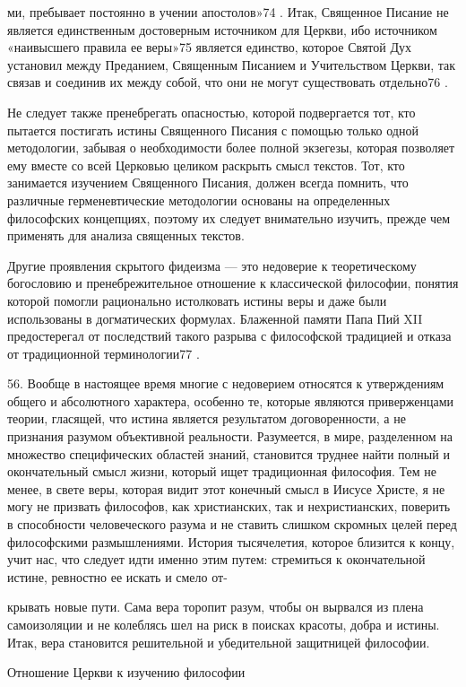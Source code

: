 \documentclass[a5paper,10pt]{article}
\begin{document}
ми, пребывает постоянно в учении апостолов»74 . Итак, Священное Писание не
является единственным достоверным источником для Церкви, ибо источником
«наивысшего правила ее веры»75 является единство, которое Святой Дух установил
между Преданием, Священным Писанием и Учительством Церкви, так связав и
соединив их между собой, что они не могут существовать отдельно76 .

Не следует также пренебрегать опасностью, которой подвергается тот, кто
пытается постигать истины Священного Писания с помощью только одной
методологии, забывая о необходимости более полной экзегезы, которая позволяет
ему вместе со всей Церковью целиком раскрыть смысл текстов. Тот, кто занимается
изучением Священного Писания, должен всегда помнить, что различные
герменевтические методологии основаны на определенных философских концепциях,
поэтому их следует внимательно изучить, прежде чем применять для анализа
священных текстов.

Другие проявления скрытого фидеизма — это недоверие к теоретическому богословию
и пренебрежительное отношение к классической философии, понятия которой помогли
рационально истолковать истины веры и даже были использованы в догматических
формулах. Блаженной памяти Папа Пий XII предостерегал от последствий такого
разрыва с философской традицией и отказа от традиционной терминологии77 .

56. Вообще в настоящее время многие с недоверием относятся к утверждениям
общего и абсолютного характера, особенно те, которые являются приверженцами
теории, гласящей, что истина является результатом договоренности, а не
признания разумом объективной реальности. Разумеется, в мире, разделенном на
множество специфических областей знаний, становится труднее найти полный и
окончательный смысл жизни, который ищет традиционная философия. Тем не менее, в
свете веры, которая видит этот конечный смысл в Иисусе Христе, я не могу не
призвать философов, как христианских, так и нехристианских, поверить в
способности человеческого разума и не ставить слишком скромных целей перед
философскими размышлениями. История тысячелетия, которое близится к концу, учит
нас, что следует идти именно этим путем: стремиться к окончательной истине,
ревностно ее искать и смело от-

крывать новые пути. Сама вера торопит разум, чтобы он вырвался из плена
самоизоляции и не колеблясь шел на риск в поисках красоты, добра и истины.
Итак, вера становится решительной и убедительной защитницей философии.

Отношение Церкви к изучению философии
\end{document}
